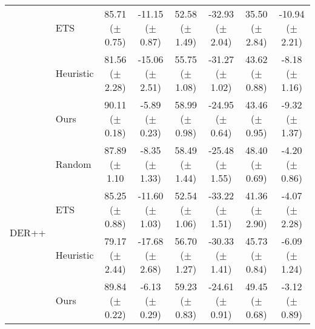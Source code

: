 \begin{table}[t]
{\begin{tabular}{l l c c c c c c}
         & ETS & 85.71 ($\pm$ 0.75) & -11.15 ($\pm$ 0.87) & 52.58 ($\pm$ 1.49) & -32.93 ($\pm$ 2.04) & 35.50  ($\pm$ 2.84) & -10.94  ($\pm$ 2.21) \\
         & Heuristic & 81.56 ($\pm$ 2.28) & -15.06 ($\pm$ 2.51) & 55.75 ($\pm$ 1.08) & -31.27 ($\pm$ 1.02) & 43.62 ($\pm$ 0.88) & -8.18 ($\pm$ 1.16) \\
         & Ours & 90.11 ($\pm$ 0.18) & -5.89 ($\pm$ 0.23) & 58.99 ($\pm$ 0.98) & -24.95 ($\pm$ 0.64) & 43.46  ($\pm$ 0.95) & -9.32  ($\pm$ 1.37) \\
        \midrule
        \multirow{4}{*}{DER++} & Random & 87.89 ($\pm$ 1.10& -8.35 ($\pm$ 1.33) & 58.49  ($\pm$ 1.44) & -25.48  ($\pm$ 1.55) & 48.40  ($\pm$ 0.69) & -4.20  ($\pm$ 0.86) \\
         & ETS & 85.25 ($\pm$ 0.88) & -11.60 ($\pm$ 1.03) & 52.54  ($\pm$ 1.06) & -33.22  ($\pm$ 1.51) & 41.36  ($\pm$ 2.90) & -4.07  ($\pm$ 2.28) \\
         & Heuristic & 79.17 ($\pm$ 2.44) & -17.68 ($\pm$ 2.68) & 56.70 ($\pm$ 1.27) & -30.33 ($\pm$ 1.41) & 45.73 ($\pm$ 0.84) & -6.09 ($\pm$ 1.24) \\
         & Ours & 89.84 ($\pm$ 0.22) & -6.13 ($\pm$ 0.29) & 59.23  ($\pm$ 0.83) & -24.61  ($\pm$ 0.91) & 49.45  ($\pm$ 0.68) & -3.12  ($\pm$ 0.89) \\
        \bottomrule
    \end{tabular}
    }
    \vspace{-3mm}
    \label{tab:bwt_sota_models_applied_to_rsmcts}
\end{table}


